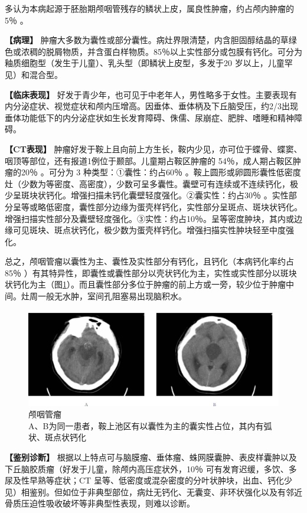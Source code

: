 多认为本病起源于胚胎期颅咽管残存的鳞状上皮，属良性肿瘤，约占颅内肿瘤的5％
。

\textbf{【病理】}
肿瘤大多数为囊性或部分囊性。病灶界限清楚，内含胆固醇结晶的草绿色或浓稠的脱屑物质，并含蛋白样物质。85％以上实性部分或包膜有钙化。可分为釉质细胞型（发生于儿童）、乳头型（即鳞状上皮型，多发于20
岁以上，儿童罕见）和混合型。

\textbf{【临床表现】}
好发于青少年，也可见于中老年人，男性略多于女性。主要表现有内分泌症状、视觉症状和颅内压增高。因垂体、垂体柄及下丘脑受压，约2/3出现垂体功能低下的内分泌症状如生长发育障碍、侏儒、尿崩症、肥胖、嗜睡和精神障碍。

\textbf{【CT表现】}
肿瘤好发于鞍上且向前上方生长，鞍内少见，亦可位于蝶骨、蝶窦、咽顶等部位，还有报道1例位于颞部。儿童期占鞍区肿瘤的
54％，成人期占鞍区肿瘤的20％ 。可分为 3 种类型：①囊性：约占60％
。鞍上圆形或卵圆形囊性低密度灶（少数为等密度、高密度），少数可呈多囊性。囊壁可有连续或不连续钙化，极少呈斑块状钙化。增强扫描未钙化囊壁轻度强化。②囊实性：约占30％
。实性部分呈等或略低密度，囊性部分边缘为蛋壳样钙化，实性部分呈斑点、斑块状钙化。增强扫描实性部分及囊壁轻度强化。③实性：约占10％。呈等密度肿块，其内或边缘可见斑块、斑点状钙化，极少数为蛋壳样钙化。增强扫描实性肿块轻至中度强化。

总之，颅咽管瘤以囊性为主、囊性及实性部分有钙化，且钙化（本病钙化率约占85％
）有其特异性，即囊性或囊性部分以壳状钙化为主，实性或实性部分以斑块状钙化为主（图\ref{fig2-46}）。而且囊性部分多位于肿瘤的前上方或一旁，较少位于肿瘤中间。灶周一般无水肿，室间孔阻塞易出现脑积水。

\begin{figure}[!htbp]
 \centering
 \includegraphics[width=.7\textwidth,height=\textheight,keepaspectratio]{./images/Image00075.jpg}
 \captionsetup{justification=centering}
 \caption{颅咽管瘤\\{\small A、B为同一患者，鞍上池区有以囊性为主的囊实性占位，其内有弧状、斑点状钙化}}
 \label{fig2-46}
  \end{figure} 

\textbf{【鉴别诊断】}
根据以上特点可与脑膜瘤、垂体瘤、蛛网膜囊肿、表皮样囊肿以及下丘脑胶质瘤（好发于儿童，除颅内高压症状外，10％
可有发育迟缓，多饮、多尿及性早熟等症状；CT
呈等、低密度或混杂密度的分叶状肿块，出血、钙化少见）相鉴别。但如位于非典型部位，病灶无钙化、无囊变、非环状强化以及有邻近骨质压迫性吸收破坏等非典型性表现，则难以诊断。

